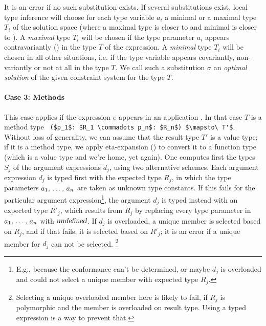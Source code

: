 It is an error if no such substitution exists. If several substitutions exist, local type inference will choose for each type variable $a_i$ a minimal or a maximal type $T_i$ of the solution space (where a maximal type is closer to  and minimal is closer to ). A {\em maximal} type $T_i$ will be chosen if the type parameter $a_i$ appears contravariantly () in the type $T$ of the expression. A {\em minimal} type $T_i$ will be chosen in all other situations, i.e. if the type variable appears covariantly, non-variantly or not at all in the type $T$. We call such a substitution $\sigma$ an {\em optimal solution} of the given constraint system for the type $T$. 

\paragraph{Case 3: Methods}
This case applies if the expression $e$ appears in an application . In that case $T$ is a method type ~\lstinline!($p_1$: $R_1 \commadots p_n$: $R_n$) $\mapsto\ T'$!. Without loss of generality, we can assume that the result type $T'$ is a value type; if it is a method type, we apply eta-expansion () to convert it to a function type (which is a value type and we're home, yet again). One computes first the types $S_j$ of the argument expressions $d_j$, using two alternative schemes. Each argument expression $d_j$ is typed first with the expected type $R_j$, in which the type parameters $a_1 ,\, \ldots ,\, a_n$ are taken as unknown type constants. If this fails for the particular argument expression\footnote{E.g., because the conformance can't be determined, or maybe $d_j$ is overloaded and could not select a unique member with expected type $R_j$.}, the argument $d_j$ is typed instead with an expected type $R'_j$, which results from $R_j$ by replacing every type parameter in $a_1 ,\, \ldots ,\, a_n$ with $\mbox{\sl undefined}$. If $d_j$ is overloaded, a unique member is selected based on $R_j$, and if that fails, it is selected based on $R'_j$; it is an error if a unique member for $d_j$ can not be selected. \footnote{Selecting a unique overloaded member here is likely to fail, if $R_j$ is polymorphic and the member is overloaded on result type. Using a typed expression is a way to prevent that.}

